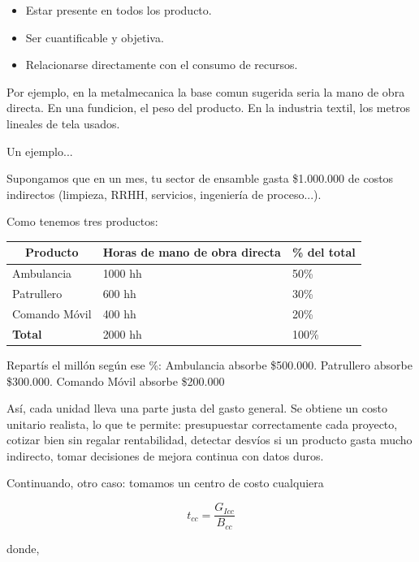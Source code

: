 \documentclass[a4paper,oneside,11pt]{article}
\begin{document}
\begin{itemize}
    \item Estar presente en todos los producto.
    \item Ser cuantificable y objetiva.
    \item Relacionarse directamente con el consumo de recursos.
\end{itemize}

Por ejemplo, en la metalmecanica la base comun sugerida seria la mano de obra directa. En una fundicion, el peso del producto. En la industria textil, los metros lineales de tela usados.

Un ejemplo...

Supongamos que en un mes, tu sector de ensamble gasta \$1.000.000 de costos indirectos (limpieza, RRHH, servicios, ingeniería de proceso...).

Como tenemos tres productos:

\begin{table}[ht!]
\centering
\begin{tabular}{|l|l|l|}
\hline
\multicolumn{1}{|c|}{\textbf{Producto}} & \multicolumn{1}{c|}{\textbf{Horas de mano de obra directa}} & \multicolumn{1}{c|}{\textbf{\% del total}} \\ \hline
Ambulancia & 1000 hh & 50\% \\ \hline
Patrullero & 600 hh & 30\% \\ \hline
Comando Móvil & 400 hh & 20\% \\ \hline
\textbf{Total} & 2000 hh & 100\% \\ \hline
\end{tabular}
\end{table}

Repartís el millón según ese \%: Ambulancia absorbe \$500.000. Patrullero absorbe \$300.000. Comando Móvil absorbe \$200.000

Así, cada unidad lleva una parte justa del gasto general. Se obtiene un costo unitario realista, lo que te permite: presupuestar correctamente cada proyecto, cotizar bien sin regalar rentabilidad, detectar desvíos si un producto gasta mucho indirecto, tomar decisiones de mejora continua con datos duros.

Continuando, otro caso: tomamos un centro de costo cualquiera

\begin{equation}
    t_{cc} = \dfrac{G_{Icc}}{B_{cc}}
\end{equation}

donde,
\end{document}
